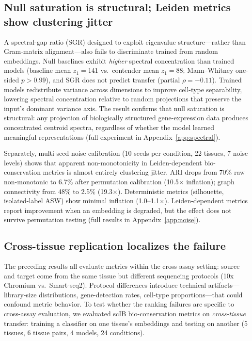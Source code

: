 \documentclass[11pt]{article}
\begin{document}
\subsection{Null saturation is structural; Leiden metrics show clustering jitter}
\label{sec:spectral}

A spectral-gap ratio (SGR) designed to exploit eigenvalue
structure---rather than Gram-matrix alignment---also fails to
discriminate trained from random embeddings. Null baselines exhibit
\emph{higher} spectral concentration than trained models (baseline mean
$z_1 = 141$ vs.\ contender mean $z_1 = 88$; Mann--Whitney one-sided
$p > 0.99$), and SGR does not predict transfer (partial
$\rho = -0.11$). Trained models redistribute variance across dimensions
to improve cell-type separability, lowering spectral concentration
relative to random projections that preserve the input's dominant
variance axis. The result confirms that null saturation is structural:
any projection of biologically structured gene-expression data produces
concentrated centroid spectra, regardless of whether the model learned
meaningful representations (full experiment in
Appendix~\ref{app:spectral}).

Separately, multi-seed noise calibration (10 seeds per condition, 22
tissues, 7 noise levels) shows that apparent non-monotonicity in
Leiden-dependent bio-conservation metrics is almost entirely clustering
jitter. ARI drops from 70\% raw non-monotonic to 6.7\% after
permutation calibration (10.5$\times$ inflation); graph connectivity
from 48\% to 2.5\% (19.3$\times$). Deterministic metrics (silhouette,
isolated-label ASW) show minimal inflation (1.0--1.1$\times$).
Leiden-dependent metrics report improvement when an embedding is
degraded, but the effect does not survive permutation testing (full
results in Appendix~\ref{app:noise}).


\subsection{Cross-tissue replication localizes the failure}
\label{sec:crosstissue}

The preceding results all evaluate metrics within the cross-assay
setting: source and target come from the same tissue but different
sequencing protocols (10x Chromium vs.\ Smart-seq2). Protocol
differences introduce technical artifacts---library-size distributions,
gene-detection rates, cell-type proportions---that could confound metric
behavior. To test whether the ranking failures are specific to
cross-assay evaluation, we evaluated scIB bio-conservation metrics on
\emph{cross-tissue} transfer: training a classifier on one tissue's
embeddings and testing on another (5 tissues, 6 tissue pairs, 4 models,
24 conditions).
\end{document}
